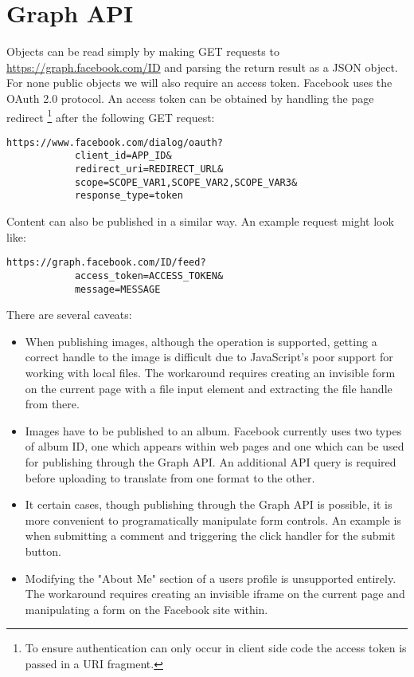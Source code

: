 \chapter{Graph API}

Objects can be read simply by making GET requests to \url{https://graph.facebook.com/ID} and parsing the return result as a JSON object. For none public objects we will also require an access token. Facebook uses the OAuth 2.0 protocol. An access token can be obtained by handling the page redirect \footnote{To ensure authentication can only occur in client side code the access token is passed in a URI fragment.} after the following GET request:

\FloatBarrier
    \begin{lstlisting}[label=code:auth,caption=Authentication GET request,float=h]
        https://www.facebook.com/dialog/oauth?
            client_id=APP_ID&
            redirect_uri=REDIRECT_URL&
            scope=SCOPE_VAR1,SCOPE_VAR2,SCOPE_VAR3&
            response_type=token
    \end{lstlisting}
\FloatBarrier

    
Content can also be published in a similar way. An example request might look like:

\FloatBarrier
    \begin{lstlisting}[label=code:pub,caption=Publishing POST request,float=h]
        https://graph.facebook.com/ID/feed?
            access_token=ACCESS_TOKEN&
            message=MESSAGE
    \end{lstlisting}
\FloatBarrier      

There are several caveats:

\begin{itemize}

    \item When publishing images, although the operation is supported, getting a correct handle to the image is difficult due to JavaScript's poor support for working with local files. The workaround requires creating an invisible form on the current page with a file input element and extracting the file handle from there.

    \item Images have to be published to an album. Facebook currently uses two types of album ID, one which appears within web pages and one which can be used for publishing through the Graph API. An additional API query is required before uploading to translate from one format to the other.
    
    \item It certain cases, though publishing through the Graph API is possible, it is more convenient to programatically manipulate form controls. An example is when submitting a comment and triggering the click handler for the submit button.
    
    \item Modifying the "About Me" section of a users profile is unsupported entirely. The workaround requires creating an invisible iframe on the current page and manipulating a form on the Facebook site within.

\end{itemize}